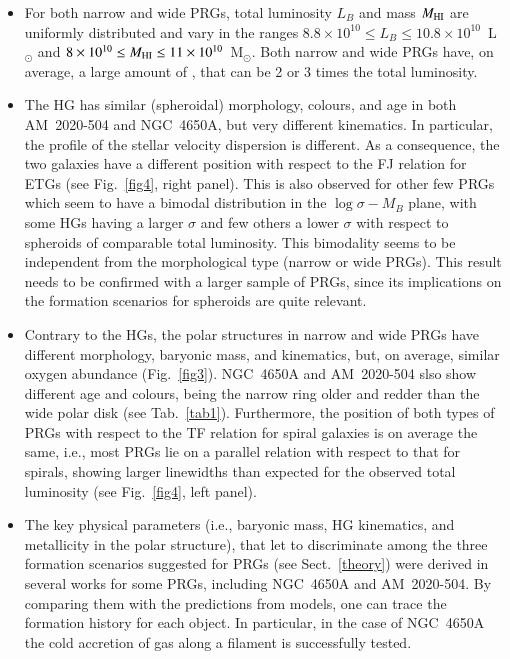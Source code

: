 \documentclass[11pt,twoside]{article}
\begin{document}
\begin{itemize}

\item For both narrow and wide PRGs, total luminosity $L_B$ 
and  mass $M_{\rm HI}$ are uniformly distributed and vary in
the ranges $8.8 \times 10^{10} \le L_B \le 10.8 \times
10^{10}$~L$_\odot$ and $8 \times 10^{10} \le M_{\rm HI} \le 11 \times
10^{10}$~M$_\odot$. Both narrow and wide PRGs have, on average, a
large amount of , that can be 2 or 3 times the total
luminosity.

\item The HG has similar (spheroidal) morphology, colours, and age in both
AM~2020-504 and NGC~4650A, but very different kinematics. In
particular, the profile of the stellar velocity dispersion is
different. As a consequence, the two galaxies have a different
position with respect to the FJ relation for ETGs (see
Fig.~\ref{fig4}, right panel). This is also observed for other few
PRGs which seem to have a bimodal distribution in the
$\log{\sigma}-M_B$ plane, with some HGs having a larger $\sigma$ and
few others a lower $\sigma$ with respect to spheroids of comparable
total luminosity. This bimodality seems to be independent from the
morphological type (narrow or wide PRGs). This result needs to be
confirmed with a larger sample of PRGs, since its implications on the
formation scenarios for spheroids are quite relevant.

\item Contrary to the HGs, the polar structures 
in narrow and wide PRGs have different morphology, baryonic mass, and
kinematics, but, on average, similar oxygen abundance
(Fig.~\ref{fig3}). NGC~4650A and AM~2020-504 slso show different age
and colours, being the narrow ring older and redder than the wide
polar disk (see Tab.~\ref{tab1}). Furthermore, the position of both
types of PRGs with respect to the TF relation for spiral galaxies is
on average the same, i.e., most PRGs lie on a parallel relation with
respect to that for spirals, showing larger  linewidths than
expected for the observed total luminosity (see Fig.~\ref{fig4}, left
panel).

\item The key physical parameters (i.e., baryonic mass, HG kinematics,
and metallicity in the polar structure), that let to discriminate
among the three formation scenarios suggested for PRGs (see
Sect.~\ref{theory}) were derived in several works for some PRGs,
including NGC~4650A and AM~2020-504. By comparing them with the
predictions from models, one can trace the formation history for each
object. In particular, in the case of NGC~4650A the cold accretion of
gas along a filament is successfully tested.

\end{itemize}
\end{document}
